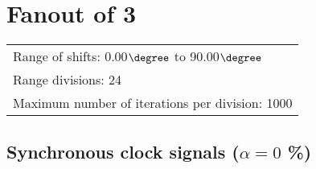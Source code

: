 \section{Fanout of 3}
\flushleft
\begin{tabular}[l]{l}

  Range of shifts: 0.00$\degree$ to 90.00$\degree$ \\
  Range divisions: 24\\
  Maximum number of iterations per division: 1000\\

\end{tabular}

\subsection{Synchronous clock signals ($\alpha=0$ \%)}

